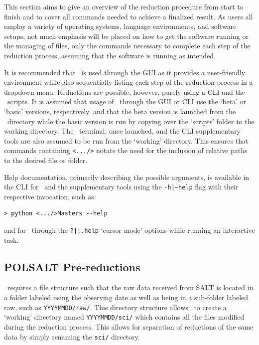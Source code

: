 This section aims to give an overview of the reduction procedure from start to finish and to cover all commands needed to achieve a finalized result. As users all employ a variety of operating systems, language environments, and software setups, not much emphasis will be placed on how to get the software running or the managing of files, only the commands necessary to complete each step of the reduction process, assuming that the software is running as intended.
\prgph

It is recommended that \polsalt\ is used through the \gls{GUI} as it provides a user-friendly environment while also sequentially listing each step of the reduction process in a dropdown menu. Reductions are possible, however, purely using a \gls{CLI} and the \polsalt\ scripts. It is assumed that usage of \polsalt\ through the \gls{GUI} or \gls{CLI} use the `beta' or `basic' versions, respectively, and that the beta version is launched from the \polsalt\ directory while the basic version is run by copying over the `scripts' folder to the working directory. The \iraf\ terminal, once launched, and the \gls{CLI} supplementary tools are also assumed to be run from the `working' directory. This ensures that commands containing \texttt{<.../>} notate the need for the inclusion of relative paths to the desired file or folder.
\prgph

Help documentation, primarily describing the possible arguments, is available in the \gls{CLI} for \polsalt\ and the supplementary tools using the \texttt{-h|--help} flag with their respective invocation, such as:

\begin{verbatim}> python <.../>Masters --help\end{verbatim}

\noindent and for \iraf\ through the \texttt{?|:.help} `cursor mode' options while running an interactive task.


\subsection{POLSALT Pre-reductions}\label{subsec:reduc_pre}

\polsalt\ requires a file structure such that the raw data received from \gls{SALT} is located in a folder labeled using the observing date as well as being in a sub-folder labeled raw, such as \texttt{YYYYMMDD/raw/}. This directory structure allows \polsalt\ to create a `working' directory named \texttt{YYYYMMDD/sci/} which contains all the files modified during the reduction process. This allows for separation of reductions of the same data by simply renaming the \texttt{sci/} directory.
\prgph

